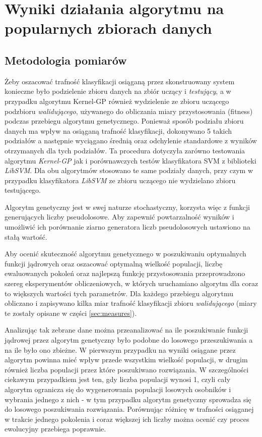 
\chapter{Wyniki działania algorytmu na popularnych zbiorach danych}

\section{Metodologia pomiarów}
	Żeby oszacować trafność klasyfikacji osiąganą przez skonstruowany system konieczne było podzielenie zbioru danych na zbiór uczący i \emph{testujący}, a w przypadku algorytmu Kernel-GP również wydzielenie ze zbioru uczącego podzbioru \emph{walidującego}, używanego do obliczania miary przystosowania (fitness) podczas przebiegu algorytmu genetycznego. Ponieważ sposób podziału zbioru danych ma wpływ na osiąganą trafność klasyfikacji, dokonywano 5 takich podziałów a następnie wyciągano średnią oraz odchylenie standardowe z wyników otrzymanych dla tych podziałów. Ta procedura dotyczyła zarówno testowania algorytmu \emph{Kernel-GP} jak i porównawczych testów klasyfikatora SVM z biblioteki \emph{LibSVM}. Dla obu algorytmów stosowano te same podziały danych, przy czym w przypadku klasyfikatora \emph{LibSVM} ze zbioru uczącego nie wydzielano zbioru testującego.
	
	Algorytm genetyczny jest w swej naturze stochastyczny, korzysta więc z funkcji generujących liczby pseudolosowe. Aby zapewnić powtarzalność wyników i umożliwić ich porównanie ziarno generatora liczb pseudolosowych ustawiono na stałą wartość.

	Aby ocenić skuteczność algorytmu genetycznego w poszukiwaniu optymalnych funkcji jądrowych oraz oszacować optymalną wielkość populacji, liczbę ewaluowanych pokoleń oraz najlepszą funkcję przystosowania przeprowadzono szereg eksperymentów obliczeniowych, w których uruchamiano algorytm dla coraz to większych wartości tych parametrów. Dla każdego przebiegu algorytmu obliczano i zapisywano kilka miar trafność klasyfikacji zbioru \emph{walidującego} (miary te zostały opisane w części \ref{sec:measures}).

	Analizując tak zebrane dane można przeanalizować na ile poszukiwanie funkcji jądrowej przez algorytm genetyczny było podobne do losowego przeszukiwania a na ile było ono zbieżne. W pierwszym przypadku na wyniki osiągane przez algorytm powinna mieć wpływ przede wszystkim wielkość populacji, w drugim również liczba populacji przez które poszukiwano rozwiązania. W szczególności ciekawym przypadkiem jest ten, gdy liczba populacji wynosi 1, czyli cały algorytm ogranicza się do wygenerowania populacji losowych osobników i wybrania jednego z nich - w tym przypadku algorytm genetyczny sprowadza się do losowego poszukiwania rozwiązania. Porównując różnicę w trafności osiąganej w trakcie jednego pokolenia i coraz większej ich liczby można ocenić czy proces ewolucyjny przebiega poprawnie.
	
